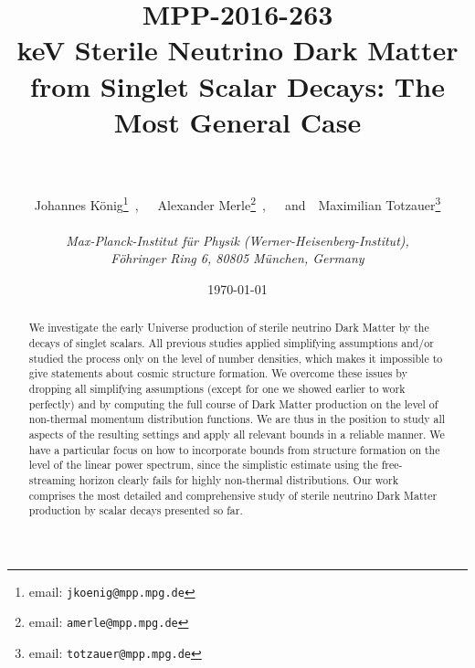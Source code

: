 \documentclass[12pt]{article}
\begin{document}


\begin{titlepage}
\title{\vspace*{-2.0cm}
\hfill {\small MPP-2016-263}\\[20mm]
\bf\Large
 keV Sterile Neutrino Dark Matter from Singlet Scalar Decays: The Most General Case \\[5mm]\ }

\author{
Johannes K\"onig\thanks{email: \tt jkoenig@mpp.mpg.de}~,~~~Alexander Merle\thanks{email: \tt amerle@mpp.mpg.de}~,~~~and~~Maximilian Totzauer\thanks{email: \tt totzauer@mpp.mpg.de}
\\ \\
{\normalsize \it Max-Planck-Institut f\"ur Physik (Werner-Heisenberg-Institut),}\\
{\normalsize \it F\"ohringer Ring 6, 80805 M\"unchen, Germany}\\
}
\date{\today}
\maketitle
\thispagestyle{empty}

\begin{abstract}
\noindent
We investigate the early Universe production of sterile neutrino Dark Matter by the decays of singlet scalars. All previous studies applied simplifying assumptions and/or studied the process only on the level of number densities, which makes it impossible to give statements about cosmic structure formation. We overcome these issues by dropping all simplifying assumptions (except for one we showed earlier to work perfectly) and by computing the full course of Dark Matter production on the level of non-thermal momentum distribution functions. We are thus in the position to study all aspects of the resulting settings and apply all relevant bounds in a reliable manner. We have a particular focus on how to incorporate bounds from structure formation on the level of the linear power spectrum, since the simplistic estimate using the free-streaming horizon clearly fails for highly non-thermal distributions. Our work comprises the most detailed and comprehensive study of sterile neutrino Dark Matter production by scalar decays presented so far. 
\end{abstract}
\end{titlepage}
\end{document}
